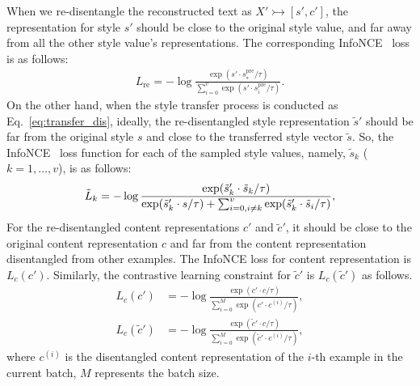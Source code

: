 \documentclass[11pt,a4paper]{article}
\renewcommand{\cite}{\citep}
\begin{document}
When we re-disentangle the reconstructed text as $X'\rightarrowtail [s',c']$, the representation for style $s'$ should be close to the original style value, and far away from all the other style value's representations. %
The corresponding InfoNCE~\cite{oord2018representation} loss is as follows:
\begin{align}
    L_\text{re} = -\log\frac{\exp(s'\cdot s_*^\text{pre}/\tau)}{\sum_{i=0}^v \exp(s'\cdot s_i^\text{pre}/\tau)}.
\end{align}
On the other hand, when the style transfer process is conducted as Eq.~\eqref{eq:transfer_dis}, ideally,   the re-disentangled style representation   $\tilde s'$ should be far from the original style $s$ and close to the transferred style vector $\tilde s$. %
So, the InfoNCE~\cite{oord2018representation} loss function for each of the sampled style values, namely, $\tilde s_k$ ($k=1,\ldots,v$), is as follows:
\begin{equation}\label{eq:7}
\begin{small}
{\tilde L_k=-\log\frac{\exp(\tilde s'_k\cdot \tilde s_k/\tau)}{\exp(\tilde s'_k\cdot s/\tau)+\sum_{i=0,i\ne k}^v \exp(\tilde s'_k\cdot \tilde s_i/\tau)},}
\end{small}
\end{equation}
For the re-disentangled content representations $c'$ and $\tilde c'$, it should be close to the original content representation $c$ and far from the content representation disentangled from other examples. The InfoNCE loss for content representation is $L_c(c')$. Similarly, the contrastive learning constraint for $\tilde c'$ is  $L_c(\tilde c')$ as follows.
\begin{align}
L_c(c') &= -\log\frac{\exp(c'\cdot c/\tau)}{\sum_{i=0}^M \exp(c'\cdot c^{(i)}/\tau)},\\
 L_c(\tilde c') &= -\log\frac{\exp(\tilde c'\cdot c/\tau)}{\sum_{i=0}^M \exp(\tilde c'\cdot c^{(i)}/\tau)},
\end{align}
where $c^{(i)}$ is the disentangled content representation of the $i$-th example in the current batch, $M$ represents the batch size. 
  
\end{document}
